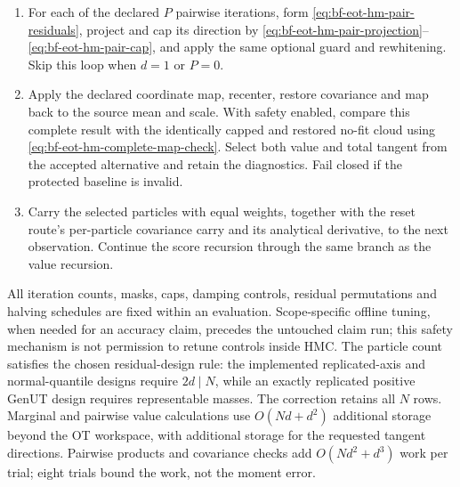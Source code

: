 \begin{enumerate}[label=(\arabic*)]
       directions, scaled LM coefficients and capped displacement in
       \eqref{eq:bf-eot-hm-directions}--\eqref{eq:bf-eot-hm-smooth-trust-cap}.
       With safety enabled, apply the covariance and post-whitening tests
       \eqref{eq:bf-eot-hm-guard-covariance}--
       \eqref{eq:bf-eot-hm-guard-acceptance}; reduce or reject the displacement
       as specified.  With safety disabled, execute the original capped
       update and whitening.
 \item For each of the declared \(P\) pairwise iterations, form
       \eqref{eq:bf-eot-hm-pair-residuals}, project and cap its direction by
       \eqref{eq:bf-eot-hm-pair-projection}--\eqref{eq:bf-eot-hm-pair-cap},
       and apply the same optional guard and rewhitening.  Skip this loop
       when \(d=1\) or \(P=0\).
 \item Apply the declared coordinate map, recenter, restore covariance and
       map back to the source mean and scale.  With safety enabled, compare
       this complete result with the identically capped and restored no-fit
       cloud using \eqref{eq:bf-eot-hm-complete-map-check}.  Select both value
       and total tangent from the accepted alternative and retain the
       diagnostics.  Fail closed if the protected baseline is invalid.
 \item Carry the selected particles with equal weights, together with the
       reset route's per-particle covariance carry and its analytical
       derivative, to the next observation.  Continue the score recursion
       through the same branch as the value recursion.
\end{enumerate}
All iteration counts, masks, caps, damping controls, residual permutations and
halving schedules are fixed within an evaluation.  Scope-specific offline
tuning, when needed for an accuracy claim, precedes the untouched claim run;
this safety mechanism is not permission to retune controls inside HMC.
The particle count satisfies the chosen residual-design rule: the implemented
replicated-axis and normal-quantile designs require \(2d\mid N\), while an
exactly replicated positive GenUT design requires representable masses.
The correction retains all \(N\) rows.  Marginal and pairwise value calculations
use \(O(Nd+d^2)\) additional storage beyond the OT workspace, with additional
storage for the requested tangent directions.  Pairwise products and covariance
checks add \(O(Nd^2+d^3)\) work per trial; eight trials bound the work, not the
moment error.

